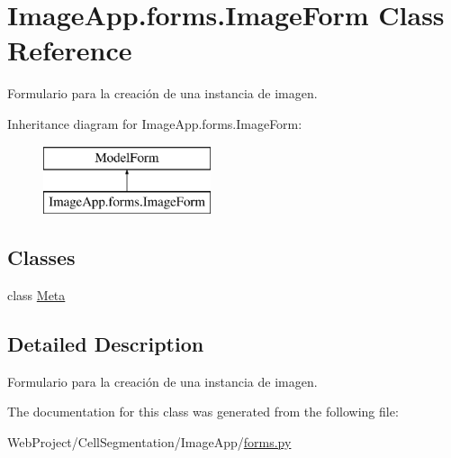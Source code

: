 \hypertarget{class_image_app_1_1forms_1_1_image_form}{}\section{Image\+App.\+forms.\+Image\+Form Class Reference}
\label{class_image_app_1_1forms_1_1_image_form}


Formulario para la creación de una instancia de imagen.  


Inheritance diagram for Image\+App.\+forms.\+Image\+Form\+:\begin{figure}[H]
\begin{center}
\leavevmode
\includegraphics[height=2.000000cm]{class_image_app_1_1forms_1_1_image_form}
\end{center}
\end{figure}
\subsection*{Classes}
\begin{DoxyCompactItemize}
\item 
class \mbox{\hyperlink{class_image_app_1_1forms_1_1_image_form_1_1_meta}{Meta}}
\end{DoxyCompactItemize}


\subsection{Detailed Description}
Formulario para la creación de una instancia de imagen. 

The documentation for this class was generated from the following file\+:\begin{DoxyCompactItemize}
\item 
Web\+Project/\+Cell\+Segmentation/\+Image\+App/\mbox{\hyperlink{forms_8py}{forms.\+py}}\end{DoxyCompactItemize}
